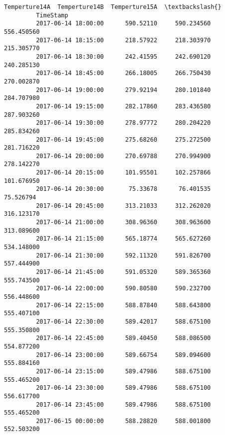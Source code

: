 \documentclass[11pt]{article}
\begin{document}
\begin{Verbatim}[commandchars=\\\{\}]
                              Temperture14A  Temperture14B  Temperture15A  \textbackslash{}
         TimeStamp                                                          
         2017-06-14 18:00:00      590.52110     590.234560     556.450560   
         2017-06-14 18:15:00      218.57922     218.303970     215.305770   
         2017-06-14 18:30:00      242.41595     242.690120     240.285130   
         2017-06-14 18:45:00      266.18005     266.750430     270.002870   
         2017-06-14 19:00:00      279.92194     280.101840     284.707980   
         2017-06-14 19:15:00      282.17860     283.436580     287.903260   
         2017-06-14 19:30:00      278.97772     280.204220     285.834260   
         2017-06-14 19:45:00      275.68260     275.272500     281.716220   
         2017-06-14 20:00:00      270.69788     270.994900     278.142270   
         2017-06-14 20:15:00      101.95501     102.257866     101.676950   
         2017-06-14 20:30:00       75.33678      76.401535      75.526794   
         2017-06-14 20:45:00      313.21033     312.262020     316.123170   
         2017-06-14 21:00:00      308.96360     308.963600     313.089600   
         2017-06-14 21:15:00      565.18774     565.627260     534.148000   
         2017-06-14 21:30:00      592.11320     591.826700     557.444900   
         2017-06-14 21:45:00      591.05320     589.365360     555.743500   
         2017-06-14 22:00:00      590.80580     590.232700     556.448600   
         2017-06-14 22:15:00      588.87840     588.643800     555.407100   
         2017-06-14 22:30:00      589.42017     588.675100     555.350800   
         2017-06-14 22:45:00      589.40450     588.086500     554.877200   
         2017-06-14 23:00:00      589.66754     589.094600     555.884160   
         2017-06-14 23:15:00      589.47986     588.675100     555.465200   
         2017-06-14 23:30:00      589.47986     588.675100     556.617700   
         2017-06-14 23:45:00      589.47986     588.675100     555.465200   
         2017-06-15 00:00:00      588.28820     588.001800     552.503200   
         

\end{Verbatim}
\end{document}
